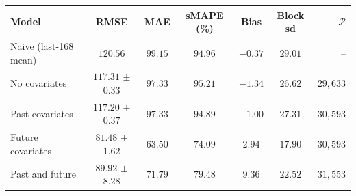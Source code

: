 \begin{tabular}{l c c c c c r}
\toprule
\textbf{Model} & RMSE & MAE & sMAPE (\%) & Bias & Block sd & $\mathcal{P}$ \\
\midrule
Naive (last-168 mean) & $120.56$ & $99.15$ & $94.96$ & $-0.37$ & $29.01$ & -- \\
\midrule
No covariates & $117.31$ $\pm$ $0.33$ & $97.33$ & $95.21$ & $-1.34$ & $26.62$ & $29{,}633$ \\
Past covariates & $117.20$ $\pm$ $0.37$ & $97.33$ & $94.89$ & $-1.00$ & $27.31$ & $30{,}593$ \\
Future covariates & $81.48$ $\pm$ $1.62$ & $63.50$ & $74.09$ & $2.94$ & $17.90$ & $30{,}593$ \\
Past and future & $89.92$ $\pm$ $8.28$ & $71.79$ & $79.48$ & $9.36$ & $22.52$ & $31{,}553$ \\
\bottomrule
\end{tabular}
